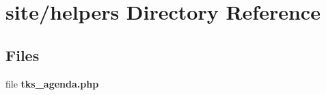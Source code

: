 \section{site/helpers Directory Reference}
\label{dir_83df3058d4d85eeada06d1262ced1b75}
\subsection*{Files}
\begin{DoxyCompactItemize}
\item 
file \textbf{ tks\+\_\+agenda.\+php}
\end{DoxyCompactItemize}
